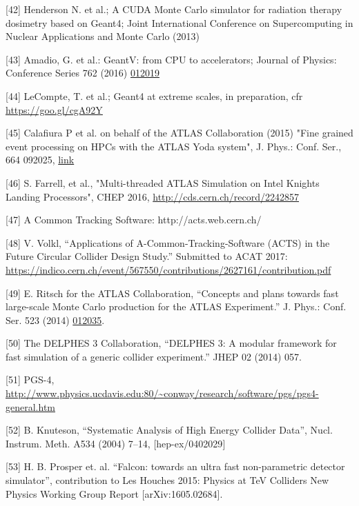 \documentclass[12pt,a4paper]{article}
\begin{document}
{[}42{]} Henderson N. et al.; A CUDA Monte Carlo simulator for radiation
therapy dosimetry based on Geant4; Joint International Conference on
Supercomputing in Nuclear Applications and Monte Carlo (2013)

{[}43{]} Amadio, G. et al.: GeantV: from CPU to accelerators; Journal of
Physics: Conference Series 762 (2016)
\href{http://iopscience.iop.org/article/10.1088/1742-6596/762/1/012019/meta}{{012019}}

{[}44{]} LeCompte, T. et al.; Geant4 at extreme scales, in preparation,
cfr \href{https://goo.gl/cgA92Y}{{https://goo.gl/cgA92Y}}

{[}45{]} Calafiura P et al. on behalf of the ATLAS Collaboration (2015)
"Fine grained event processing on HPCs with the ATLAS Yoda system", J.
Phys.: Conf. Ser., 664 092025,
\href{http://iopscience.iop.org/article/10.1088/1742-6596/664/9/092025}{{link}}

{[}46{]} S. Farrell, et al., "Multi-threaded ATLAS Simulation on Intel
Knights Landing Processors", CHEP 2016,
\href{http://cds.cern.ch/record/2242857}{{http://cds.cern.ch/record/2242857}}

{[}47{]} A Common Tracking Software: http://acts.web.cern.ch/

{[}48{]} V. Volkl, ``Applications of A-Common-Tracking-Software (ACTS)
in the Future Circular Collider Design Study.'' Submitted to ACAT 2017:
\href{https://indico.cern.ch/event/567550/contributions/2627161/contribution.pdf}{{https://indico.cern.ch/event/567550/contributions/2627161/contribution.pdf}}

{[}49{]} E. Ritsch for the ATLAS Collaboration, ``Concepts and plans
towards fast large-scale Monte Carlo production for the ATLAS
Experiment.'' J. Phys.: Conf. Ser. 523 (2014)
\href{http://iopscience.iop.org/article/10.1088/1742-6596/523/1/012035/meta}{{012035}}.

{[}50{]} The DELPHES 3 Collaboration, ``DELPHES 3: A modular framework
for fast simulation of a generic collider experiment.'' JHEP 02 (2014)
057.

{[}51{]} PGS-4,
\href{http://www.physics.ucdavis.edu:80/~conway/research/software/pgs/pgs4-general.htm}{{http://www.physics.ucdavis.edu:80/\textasciitilde{}conway/research/software/pgs/pgs4-general.htm}}

{[}52{]} B. Knuteson, ``Systematic Analysis of High Energy Collider
Data'', Nucl. Instrum. Meth. A534 (2004) 7--14, {[}hep-ex/0402029{]}

{[}53{]} H. B. Prosper et. al. ``Falcon: towards an ultra fast
non-parametric detector simulator'', contribution to Les Houches 2015:
Physics at TeV Colliders New Physics Working Group Report
{[}arXiv:1605.02684{]}.
\end{document}
